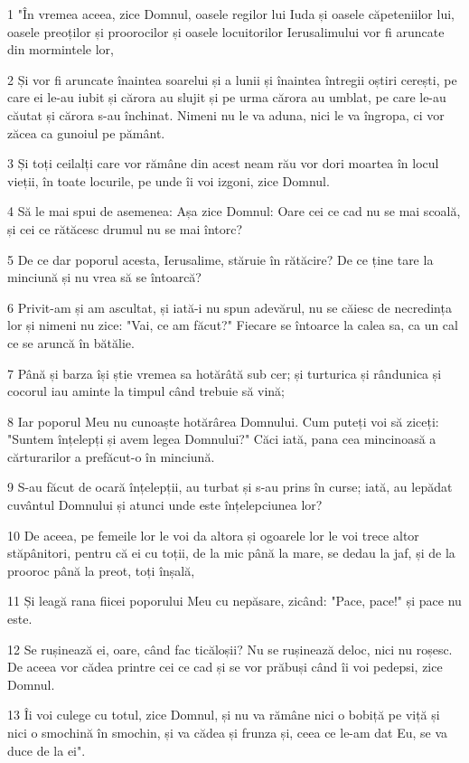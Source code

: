 \par 1 "În vremea aceea, zice Domnul, oasele regilor lui Iuda și oasele căpeteniilor lui, oasele preoților și proorocilor și oasele locuitorilor Ierusalimului vor fi aruncate din mormintele lor,
\par 2 Și vor fi aruncate înaintea soarelui și a lunii și înaintea întregii oștiri cerești, pe care ei le-au iubit și cărora au slujit și pe urma cărora au umblat, pe care le-au căutat și cărora s-au închinat. Nimeni nu le va aduna, nici le va îngropa, ci vor zăcea ca gunoiul pe pământ.
\par 3 Și toți ceilalți care vor rămâne din acest neam rău vor dori moartea în locul vieții, în toate locurile, pe unde îi voi izgoni, zice Domnul.
\par 4 Să le mai spui de asemenea: Așa zice Domnul: Oare cei ce cad nu se mai scoală, și cei ce rătăcesc drumul nu se mai întorc?
\par 5 De ce dar poporul acesta, Ierusalime, stăruie în rătăcire? De ce ține tare la minciună și nu vrea să se întoarcă?
\par 6 Privit-am și am ascultat, și iată-i nu spun adevărul, nu se căiesc de necredința lor și nimeni nu zice: "Vai, ce am făcut?" Fiecare se întoarce la calea sa, ca un cal ce se aruncă în bătălie.
\par 7 Până și barza își știe vremea sa hotărâtă sub cer; și turturica și rândunica și cocorul iau aminte la timpul când trebuie să vină;
\par 8 Iar poporul Meu nu cunoaște hotărârea Domnului. Cum puteți voi să ziceți: "Suntem înțelepți și avem legea Domnului?" Căci iată, pana cea mincinoasă a cărturarilor a prefăcut-o în minciună.
\par 9 S-au făcut de ocară înțelepții, au turbat și s-au prins în curse; iată, au lepădat cuvântul Domnului și atunci unde este înțelepciunea lor?
\par 10 De aceea, pe femeile lor le voi da altora și ogoarele lor le voi trece altor stăpânitori, pentru că ei cu toții, de la mic până la mare, se dedau la jaf, și de la prooroc până la preot, toți înșală,
\par 11 Și leagă rana fiicei poporului Meu cu nepăsare, zicând: "Pace, pace!" și pace nu este.
\par 12 Se rușinează ei, oare, când fac ticăloșii? Nu se rușinează deloc, nici nu roșesc. De aceea vor cădea printre cei ce cad și se vor prăbuși când îi voi pedepsi, zice Domnul.
\par 13 Îi voi culege cu totul, zice Domnul, și nu va rămâne nici o bobiță pe viță și nici o smochină în smochin, și va cădea și frunza și, ceea ce le-am dat Eu, se va duce de la ei".
